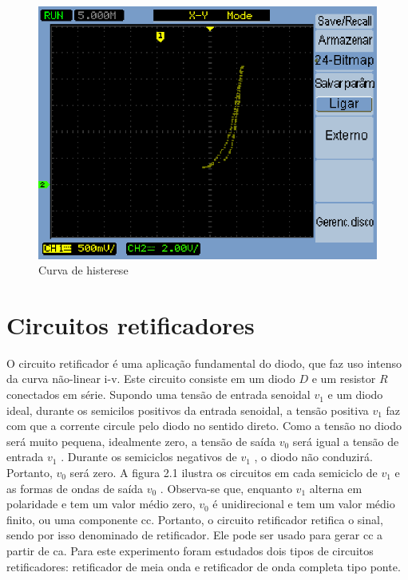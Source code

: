 \documentclass[a4paper]{article} %
\renewcommand{\thefigure}{\thesection.\arabic{figure}}
\begin{document}
\begin{figure}[h]
\begin{centering}
\includegraphics[scale=0.7]{Imagens/3.1.opcional/opcio} \caption{Curva de histerese \label{fig:q1-his}}
\par\end{centering}
\end{figure}

\renewcommand{\thefigure}{\thesubsection.\arabic{figure}}

\newpage
\section{Circuitos retificadores}
 \setcounter{figure}{0}
O circuito retificador é uma aplicação fundamental do diodo, que faz uso intenso da curva não-linear i-v. Este circuito consiste em um diodo $D$ e um resistor $R$ conectados em série. Supondo uma tensão de entrada senoidal  $v_1$ e um diodo ideal, durante os semicilos positivos da entrada senoidal, a tensão positiva  $v_1$ faz com que a corrente circule pelo diodo no sentido direto. Como a tensão no diodo será muito pequena, idealmente zero, a tensão de saída  $v_0$ será igual a tensão de entrada      $v_1$     . Durante os semiciclos negativos de    $v_1$    , o diodo não conduzirá. Portanto,   $v_0$     será zero. A figura 2.1 ilustra os circuitos em cada semiciclo de   $v_1$  e as formas de ondas de saída  $v_0$      .
        Observa-se que, enquanto $v_1$ alterna em polaridade e tem um valor médio zero, $v_0$ é unidirecional e tem um valor médio finito, ou uma componente cc. Portanto, o circuito retificador retifica o sinal, sendo por isso denominado de retificador. Ele pode ser usado para gerar cc a partir de ca.
         Para este experimento foram estudados dois tipos de circuitos retificadores: retificador de meia onda e retificador de onda completa tipo ponte.
      
\end{document}
